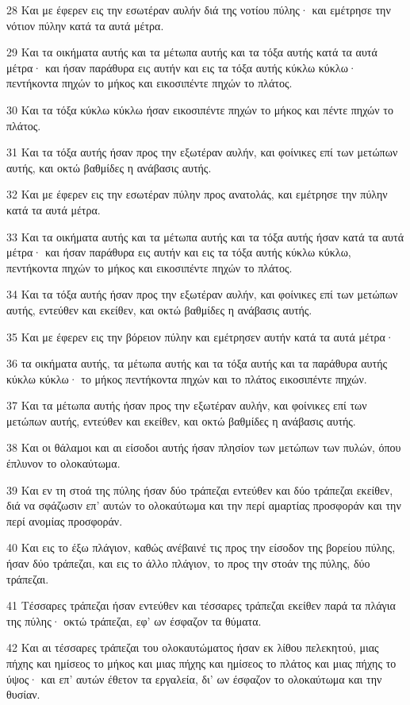 \par 28 Και με έφερεν εις την εσωτέραν αυλήν διά της νοτίου πύλης· και εμέτρησε την νότιον πύλην κατά τα αυτά μέτρα.
\par 29 Και τα οικήματα αυτής και τα μέτωπα αυτής και τα τόξα αυτής κατά τα αυτά μέτρα· και ήσαν παράθυρα εις αυτήν και εις τα τόξα αυτής κύκλω κύκλω· πεντήκοντα πηχών το μήκος και εικοσιπέντε πηχών το πλάτος.
\par 30 Και τα τόξα κύκλω κύκλω ήσαν εικοσιπέντε πηχών το μήκος και πέντε πηχών το πλάτος.
\par 31 Και τα τόξα αυτής ήσαν προς την εξωτέραν αυλήν, και φοίνικες επί των μετώπων αυτής, και οκτώ βαθμίδες η ανάβασις αυτής.
\par 32 Και με έφερεν εις την εσωτέραν πύλην προς ανατολάς, και εμέτρησε την πύλην κατά τα αυτά μέτρα.
\par 33 Και τα οικήματα αυτής και τα μέτωπα αυτής και τα τόξα αυτής ήσαν κατά τα αυτά μέτρα· και ήσαν παράθυρα εις αυτήν και εις τα τόξα αυτής κύκλω κύκλω, πεντήκοντα πηχών το μήκος και εικοσιπέντε πηχών το πλάτος.
\par 34 Και τα τόξα αυτής ήσαν προς την εξωτέραν αυλήν, και φοίνικες επί των μετώπων αυτής, εντεύθεν και εκείθεν, και οκτώ βαθμίδες η ανάβασις αυτής.
\par 35 Και με έφερεν εις την βόρειον πύλην και εμέτρησεν αυτήν κατά τα αυτά μέτρα·
\par 36 τα οικήματα αυτής, τα μέτωπα αυτής και τα τόξα αυτής και τα παράθυρα αυτής κύκλω κύκλω· το μήκος πεντήκοντα πηχών και το πλάτος εικοσιπέντε πηχών.
\par 37 Και τα μέτωπα αυτής ήσαν προς την εξωτέραν αυλήν, και φοίνικες επί των μετώπων αυτής, εντεύθεν και εκείθεν, και οκτώ βαθμίδες η ανάβασις αυτής.
\par 38 Και οι θάλαμοι και αι είσοδοι αυτής ήσαν πλησίον των μετώπων των πυλών, όπου έπλυνον το ολοκαύτωμα.
\par 39 Και εν τη στοά της πύλης ήσαν δύο τράπεζαι εντεύθεν και δύο τράπεζαι εκείθεν, διά να σφάζωσιν επ' αυτών το ολοκαύτωμα και την περί αμαρτίας προσφοράν και την περί ανομίας προσφοράν.
\par 40 Και εις το έξω πλάγιον, καθώς ανέβαινέ τις προς την είσοδον της βορείου πύλης, ήσαν δύο τράπεζαι, και εις το άλλο πλάγιον, το προς την στοάν της πύλης, δύο τράπεζαι.
\par 41 Τέσσαρες τράπεζαι ήσαν εντεύθεν και τέσσαρες τράπεζαι εκείθεν παρά τα πλάγια της πύλης· οκτώ τράπεζαι, εφ' ων έσφαζον τα θύματα.
\par 42 Και αι τέσσαρες τράπεζαι του ολοκαυτώματος ήσαν εκ λίθου πελεκητού, μιας πήχης και ημίσεος το μήκος και μιας πήχης και ημίσεος το πλάτος και μιας πήχης το ύψος· και επ' αυτών έθετον τα εργαλεία, δι' ων έσφαζον το ολοκαύτωμα και την θυσίαν.
